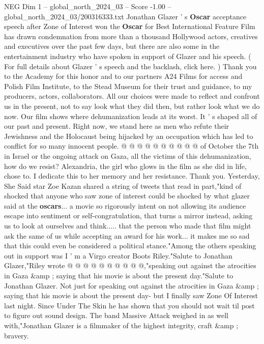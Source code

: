\begin{textsample}{NEG Dim 1 – global\_north\_2024\_03 – Score -1.00 – global\_north\_2024\_03/200316333.txt}  \label{ex:f1_neg_071}
Jonathan Glazer ' s \textbf{Oscar} acceptance speech after Zone of Interest won the \textbf{Oscar} for Best International Feature Film has drawn condemnation from more than a thousand Hollywood actors, creatives and executives over the past few days, but there are also some in the entertainment industry who have spoken in support of Glazer and his speech. ( For full details about Glazer ' s speech and the backlash, click here. ) Thank you to the Academy for this honor and to our partners A24 Films for access and Polish Film Institute, to the Stead Museum for their trust and guidance, to my producers, actors, collaborators.
All our choices were made to reflect and confront us in the present, not to say look what they did then, but rather look what we do now.
Our film shows where dehumanization leads at its worst.
It ' s shaped all of our past and present.
Right now, we stand here as men who refute their Jewishness and the Holocaust being hijacked by an occupation which has led to conflict for so many innocent people. @ @ @ @ @ @ @ @ @ @ of October the 7th in Israel or the ongoing attack on Gaza, all the victims of this dehumanization, how do we resist?
Alexandria, the girl who glows in the film as she did in life, chose to.
I dedicate this to her memory and her resistance.
Thank you.
Yesterday, She Said star Zoe Kazan shared a string of tweets that read in part,"kind of shocked that anyone who saw zone of interest could be shocked by what glazer said at the \textbf{oscars}... a movie so rigorously intent on not allowing its audience escape into sentiment or self-congratulation, that turns a mirror instead, asking us to look at ourselves and think..... that the person who made that film might ask the same of us while accepting an award for his work... it makes me so sad that this could even be considered a political stance."Among the others speaking out in support was I ' m a Virgo creator Boots Riley."Salute to Jonathan Glazer,"Riley wrote @ @ @ @ @ @ @ @ @ @,"speaking out against the atrocities in Gaza \&amp ; saying that his movie is about the present day."Salute to Jonathan Glazer.
Not just for speaking out against the atrocities in Gaza \&amp ; saying that his movie is about the present day- but I finally saw Zone Of Interest last night.
Since Under The Skin he has shown that you should not wait til post to figure out sound design.
The band Massive Attack weighed in as well with,"Jonathan Glazer is a filmmaker of the highest integrity, craft \&amp ; bravery.

\end{textsample}

